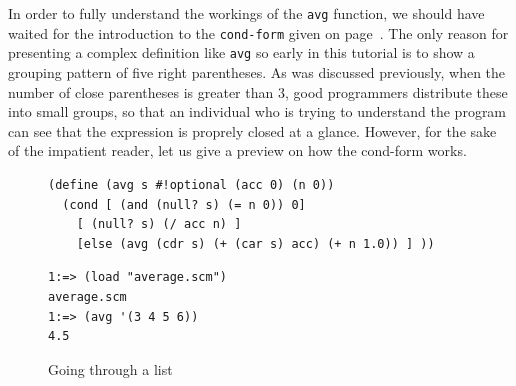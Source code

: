 \documentclass[a4paper,12pt]{book}
\newenvironment{fmpage}[1]
           {\begin{lrbox}{\fmbox}\begin{minipage}{#1}}
           {\end{minipage}\end{lrbox}\fbox{\usebox{\fmbox}}}
\begin{document}
In order to fully understand the workings
of the \verb|avg| function, we should have
waited for the introduction to the \verb|cond-form|
given on page~\pageref{page:cond-form}.
The only reason for presenting
a complex definition like \verb|avg|
so early in this tutorial is
to show a grouping pattern of five
right parentheses. As was discussed
previously, when the number of close
parentheses is greater than 3, good
programmers distribute these into small
groups, so that an individual who is
trying to understand the program
can see that the expression is
proprely closed at a glance.
However, for the sake of the impatient reader,
let us give a preview on
how the cond-form works.

\begin{figure}[!h]
\begin{fmpage}{0.9\textwidth}
\begin{verbatim}
(define (avg s #!optional (acc 0) (n 0))
  (cond [ (and (null? s) (= n 0)) 0]
    [ (null? s) (/ acc n) ]
    [else (avg (cdr s) (+ (car s) acc) (+ n 1.0)) ] ))
\end{verbatim}
\end{fmpage}

\begin{fmpage}{0.9\textwidth}
\begin{verbatim}
1:=> (load "average.scm")
average.scm
1:=> (avg '(3 4 5 6))
4.5
\end{verbatim}
\end{fmpage}
\caption{Going through a list}
\label{going-through-a-list}
\end{figure}
\end{document}
